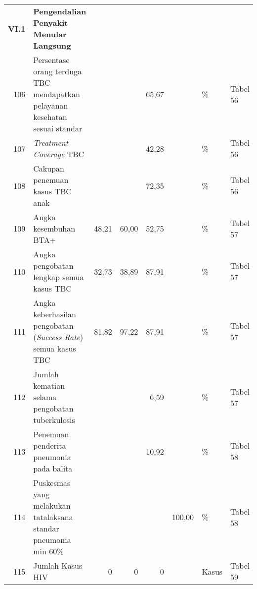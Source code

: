 \begin{small}
\begin{longtable}{rY{12em}rrrrY{5em}Y{5em}}
	        \textbf{VI.1} & \textbf{Pengendalian Penyakit Menular Langsung}                                       &        &        &         &                   &                                &          \\
	                  106 & Persentase orang terduga TBC mendapatkan pelayanan kesehatan sesuai standar           &        &        &   65,67 &                   & \%                             & Tabel 56 \\
	107 & \emph{Treatment Coverage} TBC                                                         &        &        &   42,28 &                   & \%                             & Tabel 56 \\
	                  108 & Cakupan penemuan kasus TBC anak                                                       &        &        &   72,35 &                   & \%                             & Tabel 56 \\
	109 & Angka kesembuhan BTA+                                                                 &  48,21 &  60,00 &   52,75 &                   & \%                             & Tabel 57 \\
	                  110 & Angka pengobatan lengkap semua kasus TBC                                              &  32,73 &  38,89 &   87,91 &                   & \%                             & Tabel 57 \\
	111 & Angka keberhasilan pengobatan (\emph{Success Rate}) semua kasus TBC                   &  81,82 &  97,22 &   87,91 &                   & \%                             & Tabel 57 \\
	                  112 & Jumlah kematian selama pengobatan tuberkulosis                                        &        &        &    6,59 &                   & \%                             & Tabel 57 \\
	113 & Penemuan penderita pneumonia pada balita                                              &        &        &   10,92 &                   & \%                             & Tabel 58 \\
	                  114 & Puskesmas yang melakukan tatalaksana standar pneumonia min 60\%                       &        &        &         &            100,00 & \%                             & Tabel 58 \\
	115 & Jumlah Kasus HIV                                                                      &      0 &      0 &       0 &                   & Kasus                          & Tabel 59 \\

\end{longtable}
\end{small}
